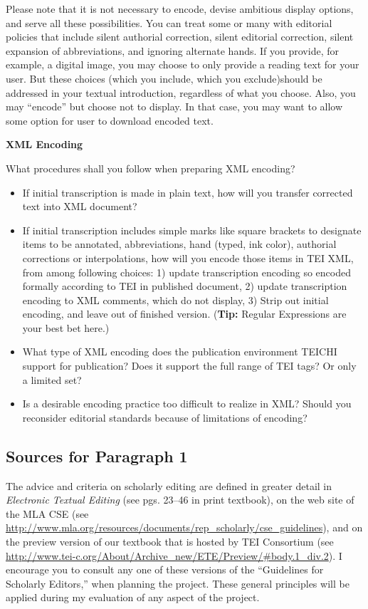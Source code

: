 \documentclass[9pt,oneside,notitlepageletterpaperopenright]{article}
\begin{document}
Please note that it is not necessary to encode, devise ambitious display
options, and serve all these possibilities. You can treat some or many
with editorial policies that include silent authorial correction, silent
editorial correction, silent expansion of abbreviations, and ignoring
alternate hands. If you provide, for example, a digital image, you may
choose to only provide a reading text for your user. But these choices
(which you include, which you exclude)should be addressed in your
textual introduction, regardless of what you choose. Also, you may
``encode'' but choose not to display. In that case, you may want to
allow some option for user to download encoded text.

\textbf{XML Encoding}

What procedures shall you follow when preparing XML encoding?

\begin{itemize}
\itemsep1pt\parskip0pt
\item
  If initial transcription is made in plain text, how will you transfer
  corrected text into XML document?
\item
  If initial transcription includes simple marks like square brackets to
  designate items to be annotated, abbreviations, hand (typed, ink
  color), authorial corrections or interpolations, how will you encode
  those items in TEI XML, from among following choices: 1) update
  transcription encoding so encoded formally according to TEI in
  published document, 2) update transcription encoding to XML comments,
  which do not display, 3) Strip out initial encoding, and leave out of
  finished version. (\textbf{Tip:} Regular Expressions are your best bet
  here.)
\item
  What type of XML encoding does the publication environment TEICHI
  support for publication? Does it support the full range of TEI tags?
  Or only a limited set?
\item
  Is a desirable encoding practice too difficult to realize in XML?
  Should you reconsider editorial standards because of limitations of
  encoding?
\end{itemize}

\subsection*{Sources for Paragraph 1}\label{sources-for-paragraph-1}

The advice and criteria on scholarly editing are defined in greater
detail in \emph{Electronic Textual Editing} (see pgs. 23--46 in print
textbook), on the web site of the MLA CSE (see
\url{http://www.mla.org/resources/documents/rep_scholarly/cse_guidelines}),
and on the preview version of our textbook that is hosted by TEI
Consortium (see
\url{http://www.tei-c.org/About/Archive_new/ETE/Preview/\#body.1_div.2}).
I encourage you to consult any one of these versions of the ``Guidelines
for Scholarly Editors,'' when planning the project. These general
principles will be applied during my evaluation of any aspect of the
project.
\end{document}
